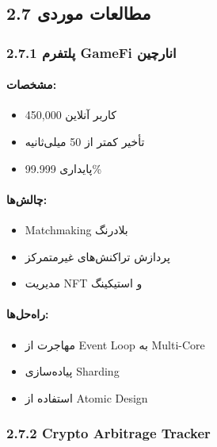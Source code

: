 \documentclass[
]{article}
\providecommand{\tightlist}{%
  \setlength{\itemsep}{0pt}\setlength{\parskip}{0pt}}
\begin{document}
\subsection{2.7 مطالعات
موردی}\label{ux645ux637ux627ux644ux639ux627ux62a-ux645ux648ux631ux62fux6cc}

\subsubsection{2.7.1 پلتفرم GameFi
انارچین}\label{ux67eux644ux62aux641ux631ux645-gamefi-ux627ux646ux627ux631ux686ux6ccux646}

\paragraph{مشخصات:}\label{ux645ux634ux62eux635ux627ux62a}

\begin{itemize}
\tightlist
\item
  450,000 کاربر آنلاین
\item
  تأخیر کمتر از 50 میلی‌ثانیه
\item
  پایداری 99.999\%
\end{itemize}

\paragraph{چالش‌ها:}\label{ux686ux627ux644ux634ux647ux627}

\begin{itemize}
\tightlist
\item
  Matchmaking بلادرنگ
\item
  پردازش تراکنش‌های غیرمتمرکز
\item
  مدیریت NFT و استیکینگ
\end{itemize}

\paragraph{راه‌حل‌ها:}\label{ux631ux627ux647ux62dux644ux647ux627}

\begin{itemize}
\tightlist
\item
  مهاجرت از Event Loop به Multi-Core
\item
  پیاده‌سازی Sharding
\item
  استفاده از Atomic Design
\end{itemize}

\subsubsection{2.7.2 Crypto Arbitrage
Tracker}\label{crypto-arbitrage-tracker}
\end{document}
